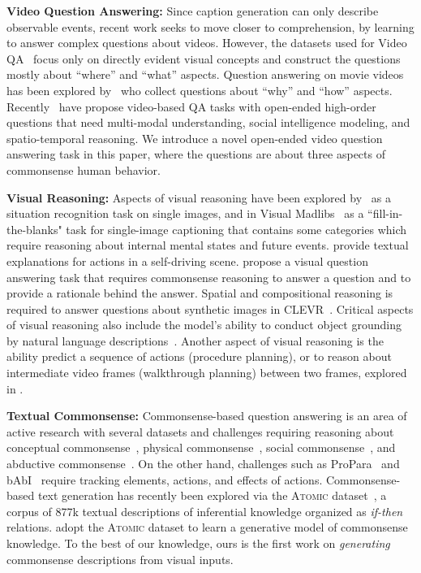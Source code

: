     \noindent\textbf{Video Question Answering:}
    Since caption generation can only describe observable events, recent work seeks to move closer to comprehension, by learning to answer complex questions about videos.
    However, the datasets used for Video QA~\citep{yang2003videoqa,xu2016msr,zhu2017uncovering} focus only on directly evident visual concepts and construct the questions mostly about ``where'' and ``what'' aspects.
    Question answering on movie videos has been explored by~\citet{tapaswi2016movieqa} who collect questions about ``why'' and ``how'' aspects.
    Recently~\citet{lei2018tvqa,zadeh2019social} have propose video-based QA tasks with open-ended high-order questions that need multi-modal understanding, social intelligence modeling, and spatio-temporal reasoning.
    We introduce a novel open-ended video question answering task in this paper, where the questions are about three aspects of commonsense human behavior.

    \noindent\textbf{Visual Reasoning:}    Aspects of visual reasoning have been explored by~\citet{yatskar2016situation} as a situation recognition task on single images, and in Visual Madlibs~\citep{yu2015visual} as a ``fill-in-the-blanks" task for single-image captioning that contains some categories which require reasoning about internal mental states and future events.
    \citet{kim2018textual} provide textual explanations for actions in a self-driving scene.
    \citet{zellers2019recognition} propose a visual question answering task that requires commonsense reasoning to answer a question and to provide a rationale behind the answer.
    Spatial and compositional reasoning is required to answer questions about synthetic images in CLEVR~\cite{johnson2017clevr}. Critical aspects of visual reasoning also include the model's ability to conduct object grounding by natural language descriptions~\citep{rohrbach2016grounding,fang2018weakly,fang2019modularized}.
    Another aspect of visual reasoning is the ability predict a sequence of actions (procedure planning), or to reason about intermediate video frames (walkthrough planning) between two frames, explored in \citet{gokhale2019blocksworld,chang2019procedure}.
    
    \noindent\textbf{Textual Commonsense:}
    Commonsense-based question answering is an area of active research with several datasets and challenges requiring reasoning about conceptual commonsense~\cite{talmor2019commonsenseqa}, physical commonsense~\citep{bisk2020piqa}, social commonsense~\citep{sap2019social}, and abductive commonsense~\citep{bhagavatula2020abductive}.
    On the other hand, challenges such as ProPara~\citep{mishra2018tracking} and bAbI~\citep{weston2015towards} require tracking elements, actions, and effects of actions.
    Commonsense-based text generation has recently been explored via the A\textsc{tomic} dataset~\cite{sap2018atomic}, a corpus of 877k textual descriptions of inferential knowledge organized as \textit{if-then} relations.
    \citet{bosselut2019comet} adopt the A\textsc{tomic} dataset to learn a generative model of commonsense knowledge.
    To the best of our knowledge, ours is the first work on \textit{generating} commonsense descriptions from visual inputs.


